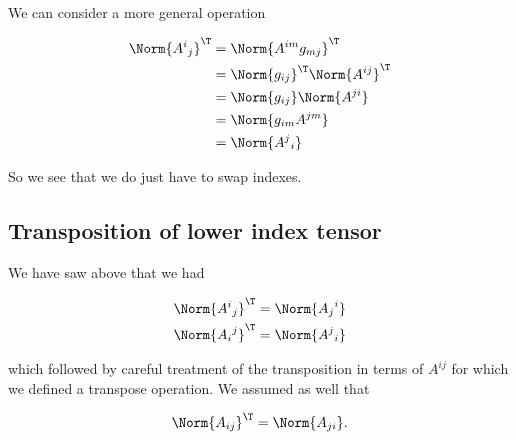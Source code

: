 We can consider a more general operation

\begin{align*}
\Norm{{A^i}_j}^\T
&=
\Norm{ A^{i m} g_{m j} }^\T \\
&=
\Norm{ g_{i j} }^\T
\Norm{ A^{i j} }^\T 
 \\
&=
\Norm{ g_{i j} }
\Norm{ A^{j i} }
 \\
&=
\Norm{ g_{i m} A^{j m} }
 \\
&=
\Norm{ {A^{j}}_i }
\end{align*}

So we see that we do just have to swap indexes.

%
%
%
%

\subsection{Transposition of lower index tensor}

We have saw above that we had

\begin{align}\label{eqn:relativisticElectrodynamicsL11:1022}
\Norm{ {A^{i}}_j }^\T &= \Norm{ {A_{j}}^i } \\
\Norm{ {A_{i}}^j }^\T &= \Norm{ {A^{j}}_i } 
\end{align}

which followed by careful treatment of the transposition in terms of $A^{i j}$ for which we defined a transpose operation.  We assumed as well that

\begin{equation}\label{eqn:relativisticElectrodynamicsL11:1042}
\Norm{ A_{i j} }^\T = \Norm{ A_{j i} }.
\end{equation}


